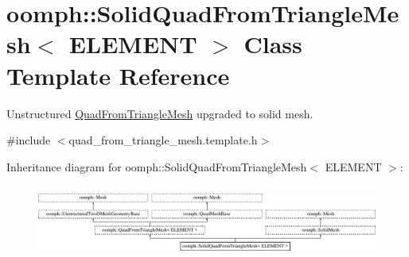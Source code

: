 \hypertarget{classoomph_1_1SolidQuadFromTriangleMesh}{}\section{oomph\+:\+:Solid\+Quad\+From\+Triangle\+Mesh$<$ E\+L\+E\+M\+E\+NT $>$ Class Template Reference}
\label{classoomph_1_1SolidQuadFromTriangleMesh}


Unstructured \hyperlink{classoomph_1_1QuadFromTriangleMesh}{Quad\+From\+Triangle\+Mesh} upgraded to solid mesh.  




{\ttfamily \#include $<$quad\+\_\+from\+\_\+triangle\+\_\+mesh.\+template.\+h$>$}

Inheritance diagram for oomph\+:\+:Solid\+Quad\+From\+Triangle\+Mesh$<$ E\+L\+E\+M\+E\+NT $>$\+:\begin{figure}[H]
\begin{center}
\leavevmode
\includegraphics[height=2.408602cm]{classoomph_1_1SolidQuadFromTriangleMesh}
\end{center}
\end{figure}
